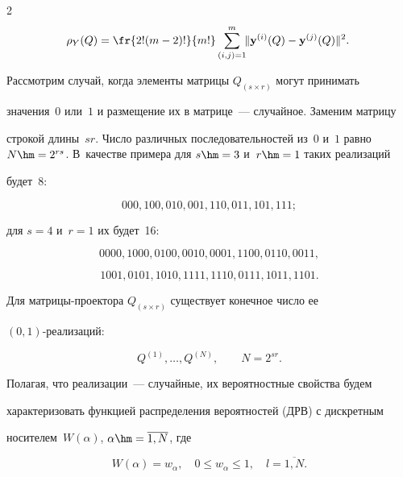 \begin{multicols}{2}
\begin{equation}
\label{5_3}


\!\!\!\rho_Y(Q) = \fr{2! (m-2)!}{m!} \sum\limits^m_{(i,j)=1}\!\!\|\mathbf{y}^{(i)}(Q) - 


\mathbf{y}^{(j)}(Q)\|^2.\!\!


\end{equation}





Рассмотрим случай, когда элементы матрицы $Q_{(s \times r)}$ могут принимать 


значения~$0$ или~$1$ и размещение их в матрице~--- случайное. Заменим матрицу 


строкой длины~$sr$. Число различных последовательностей из~$0$ и~$1$ равно $N 


\hm= 2^{rs}$. В~качестве примера для $s \hm= 3$ и~$r \hm= 1$ таких реализаций 


будет~8:


$$


000, 100, 010, 001, 110, 011, 101, 111;


$$


для $s = 4$ и~$r = 1$ их будет~16:


$$


0000, 1000, 0100, 0010, 0001, 1100, 0110, 0011,


$$


$$


1001, 0101, 1010, 1111, 1110, 0111, 1011, 1101.


$$


Для матрицы-проектора $Q_{(s \times r)}$ существует конечное число ее 


$(0,1)$-реализаций:


\begin{equation*}




Q^{(1)}, \dots,  Q^{(N)},\qquad N = 2^{sr}.


\end{equation*}


Полагая, что реализации~--- случайные, их вероятностные свойства будем 


характеризовать  функцией распределения вероятностей (ДРВ) с дискретным 


носителем~$W(\alpha)$, $\alpha \hm= \overline{1,N}$, где


\begin{equation*}




W(\alpha) = w_{\alpha},\quad 0 \le w_{\alpha} \le 1,\quad l = \overline{1,N}.



\end{equation*}
\end{multicols}
